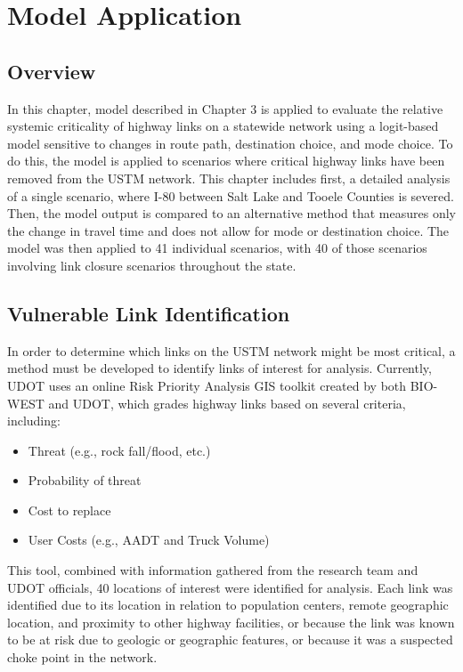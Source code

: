 \chapter{Model Application}
\label{chp:chapter4}
\graphicspath{{figures/}{figures/chapter4/}}

\section{Overview}
In this chapter, model described in Chapter 3 is applied to evaluate the relative systemic
criticality of highway links on a statewide network using a logit-based model
sensitive to changes in route path, destination choice, and mode choice. To do this, the model is applied to scenarios
where critical highway links have been removed from the USTM network. This
chapter includes first, a detailed analysis of a single scenario, where I-80
between Salt Lake and Tooele Counties is severed. Then, the model
output is compared to an alternative method that measures only the change in travel
time and does not allow for mode or destination choice. The model was then
applied to 41 individual scenarios, with 40 of those scenarios involving link
closure scenarios throughout the state.

\section{Vulnerable Link Identification}
In order to determine which links on the USTM network might be most critical,
a method must be developed to identify links of interest for analysis. Currently, UDOT uses
an online Risk Priority Analysis GIS toolkit created by both BIO-WEST and UDOT,
which grades highway links based on several criteria, including:

\begin{itemize}
   \item {Threat (e.g., rock fall/flood, etc.)}
   \item {Probability of threat}
   \item {Cost to replace}
   \item {User Costs (e.g., AADT and Truck Volume)}
\end{itemize}

This tool, combined with information gathered from the research team and UDOT
officials, 40 locations of interest were identified for analysis. Each link was
identified due to its location in relation to
population centers, remote geographic location, and proximity to other highway
facilities, or because the link was known to be at risk due to geologic or geographic features, or
because it was a suspected choke point in the network.

